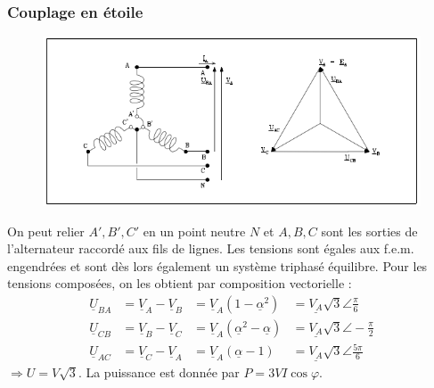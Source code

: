 		\subsubsection{Couplage en étoile}
		\begin{figure}
		\vspace{-5mm}
		\includegraphics[scale=0.4]{ch1/image9.png}
		\end{figure}
		On peut relier $A',B',C'$ en un point neutre $N$ et $A,B,C$ sont les 
		sorties de l'alternateur raccordé aux fils de lignes. Les tensions 
		sont égales aux f.e.m. engendrées et sont dès lors également un 
		système triphasé équilibre. Pour les tensions composées, on les 
		obtient par composition vectorielle :
		\vspace{1cm}
		\begin{equation}
		\begin{array}{llll}
		\underline{U}_{BA} &= \underline{V}_A-\underline{V}_B &= \underline{V}_A
		(1-\underline{\alpha}^2) &= \underline{V_A}\sqrt{3}\angle\frac{\pi}{6}\\
		\underline{U}_{CB} &= \underline{V}_B-\underline{V}_C &= \underline{V}_A
		(\underline{\alpha}^2-\underline{\alpha}) &= \underline{V_A}\sqrt{3}\angle
		-\frac{\pi}{2}		\\
		\underline{U}_{AC} &= \underline{V}_C-\underline{V}_A &= \underline{V}_A
		(\underline{\alpha}-1) &= \underline{V_A}\sqrt{3}\angle\frac{5\pi}{6}
		\end{array}
		\end{equation}
		$\Longrightarrow U = V\sqrt{3}$. La puissance est donnée par $P = 3VI
		\cos\varphi$.
		
